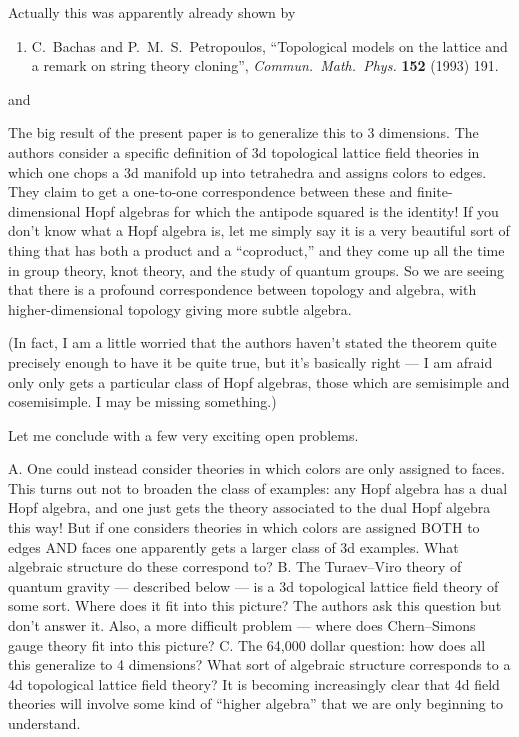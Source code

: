\documentclass{article}
\def\tightlist{}
\renewcommand{\texttt}[1]{%
  \begingroup
  \ttfamily
  \begingroup\lccode`~=`/\lowercase{\endgroup\def~}{/\discretionary{}{}{}}%
  \begingroup\lccode`~=`[\lowercase{\endgroup\def~}{[\discretionary{}{}{}}%
  \begingroup\lccode`~=`.\lowercase{\endgroup\def~}{.\discretionary{}{}{}}%
  \catcode`/=\active\catcode`[=\active\catcode`.=\active
  \scantokens{#1\noexpand}%
  \endgroup
}
\begin{document}
Actually this was apparently already shown by

\begin{enumerate}
\def\labelenumi{\arabic{enumi})}
\setcounter{enumi}{1}
\tightlist
\item
  C.\ Bachas and P.\ M.\ S.\ Petropoulos, ``Topological models on the lattice 
  and a remark on string theory cloning'', \emph{Commun.\ Math.\ Phys.}
  \textbf{152} (1993) 191.
\end{enumerate}

and


The big result of the present paper is to generalize this to 3
dimensions. The authors consider a specific definition of 3d topological
lattice field theories in which one chops a 3d manifold up into
tetrahedra and assigns colors to edges. They claim to get a one-to-one
correspondence between these and finite-dimensional Hopf algebras for
which the antipode squared is the identity! If you don't know what a
Hopf algebra is, let me simply say it is a very beautiful sort of thing
that has both a product and a ``coproduct,'' and they come up all the
time in group theory, knot theory, and the study of quantum groups. So
we are seeing that there is a profound correspondence between topology
and algebra, with higher-dimensional topology giving more subtle
algebra.

(In fact, I am a little worried that the authors haven't stated the
theorem quite precisely enough to have it be quite true, but it's
basically right --- I am afraid only only gets a particular class of
Hopf algebras, those which are semisimple and cosemisimple. I may be
missing something.)

Let me conclude with a few very exciting open problems.

A. One could instead consider theories in which colors are only assigned
to faces. This turns out not to broaden the class of examples: any Hopf
algebra has a dual Hopf algebra, and one just gets the theory associated
to the dual Hopf algebra this way! But if one considers theories in
which colors are assigned BOTH to edges AND faces one apparently gets a
larger class of 3d examples. What algebraic structure do these
correspond to? B. The Turaev--Viro theory of quantum gravity ---
described below --- is a 3d topological lattice field theory of some
sort. Where does it fit into this picture? The authors ask this question
but don't answer it. Also, a more difficult problem --- where does
Chern--Simons gauge theory fit into this picture? C. The 64,000 dollar
question: how does all this generalize to 4 dimensions? What sort of
algebraic structure corresponds to a 4d topological lattice field
theory? It is becoming increasingly clear that 4d field theories will
involve some kind of ``higher algebra'' that we are only beginning to
understand.
\end{document}
